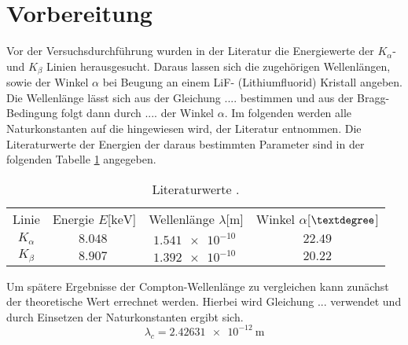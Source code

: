 \section{Vorbereitung}

Vor der Versuchsdurchführung wurden in der Literatur die Energiewerte der $K_{\alpha}$- und $K_{\beta}$ Linien herausgesucht. Daraus lassen sich die zugehörigen Wellenlängen, sowie der Winkel
$\alpha$ bei Beugung an einem LiF- (Lithiumfluorid) Kristall angeben. Die Wellenlänge lässt sich aus der Gleichung .... bestimmen und aus der Bragg-Bedingung folgt dann durch .... der Winkel $\alpha$.
Im folgenden werden alle Naturkonstanten auf die hingewiesen wird, der Literatur \cite{Naturkonstanten} entnommen.
Die Literaturwerte der Energien der daraus bestimmten Parameter \cite{database} sind in der folgenden Tabelle \ref{tab:vorbereitung} angegeben.
\begin{table}
\centering
\caption{Literaturwerte \cite{database}.}
\label{tab:vorbereitung}
\begin{tabular}{c c c c}
    \toprule
    Linie & Energie $E$[$\si{\kilo\electronvolt}$] & Wellenlänge $\lambda$[$\si{\meter}$] & Winkel $\alpha$[$\textdegree$]\\
    $K_{\alpha}$    &  $\SI{8.048}{}$ & $\SI{1.541e-10}{}$  & $22.49$ \\
    $K_{\beta}$   &   $\SI{8.907}{}$  & $\SI{1.392e-10}{}$  & $20.22$ \\
    \midrule
\end{tabular}
\end{table}
Um spätere Ergebnisse der Compton-Wellenlänge zu vergleichen kann zunächst der theoretische Wert errechnet werden. Hierbei wird Gleichung
... verwendet und durch Einsetzen der Naturkonstanten ergibt sich.
\begin{equation}
\label{eqn:comptontheoriewert}
\lambda_{c} = \SI{2.42631e-12}{\meter}
\end{equation}